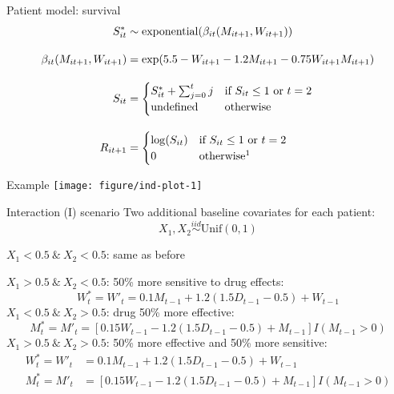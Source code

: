 \documentclass{beamer}
\begin{document}
\begin{frame}[c]{Patient model: survival}
  \begin{align*}
    S^{*}_{it} &\sim \operatorname{exponential}(\beta_{it}(M_{it + 1}, W_{it + 1})) \\[1em]
    \beta_{it}(M_{it+1}, W_{it+1}) &= \exp(5.5 - W_{it+1} - 1.2 M_{it+1} - 0.75 W_{it+1} M_{it+1}) \\[1em]
    S_{it} &= \begin{cases}
      S^{*}_{it} + \sum_{j = 0}^{t} j & \text{if } S_{it} \leq 1 \text{ or } t = 2 \\
      \text{undefined} & \text{otherwise}
    \end{cases} \\[1em]
    R_{it + 1} &=\begin{cases}
          \log(S_{it}) & \text{if } S_{it} \leq 1 \text{ or } t = 2 \\
          0 & \text{otherwise\footnotemark}
        \end{cases}
  \end{align*}  
\end{frame}

\begin{frame}[c]{Example}
  \texttt{[image: figure/ind-plot-1]} 
\end{frame}

\begin{frame}[c]{Interaction (I) scenario}
  Two additional baseline covariates for each patient:
  \begin{equation*}
    X_{1}, X_{2} \overset{iid}{\sim} \text{Unif}(0, 1)
  \end{equation*}
  
  $X_{1} < 0.5 \ \& \ X_{2} < 0.5$: same as before
  
  
  $X_{1} > 0.5 \ \& \ X_{2} < 0.5$: 50\% more sensitive to drug effects:
  \begin{equation*}
  W^{*}_{t} = W'_{t} = 0.1 M_{t-1} + 1.2 (1.5 D_{t-1} - 0.5) + W_{t - 1}
  \end{equation*}
  $X_{1} < 0.5 \ \& \ X_{2} > 0.5$: drug 50\% more effective:
  \begin{equation*}
  M^{*}_{t} =  M'_{t} = [0.15 W_{t-1} - 1.2 (1.5 D_{t-1} - 0.5) + M_{t - 1}] I(M_{t-1} > 0)
  \end{equation*}
  $X_{1} > 0.5 \ \& \ X_{2} > 0.5$: 50\% more effective and 50\% more sensitive:
  \begin{align*}
  W^{*}_{t} = W'_{t} &= 0.1 M_{t-1} + 1.2 (1.5 D_{t-1} - 0.5) + W_{t - 1} \\
  M^{*}_{t} = M'_{t} &= [0.15 W_{t-1} - 1.2 (1.5 D_{t-1} - 0.5) + M_{t - 1}] I(M_{t-1} > 0)
  \end{align*}
\end{frame}
\end{document}
